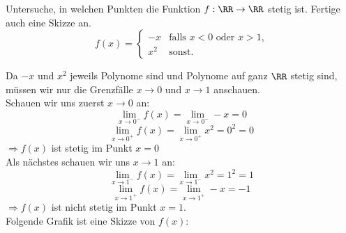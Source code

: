 Untersuche, in welchen Punkten die Funktion $f:\RR\to\RR$ stetig ist. Fertige auch eine Skizze an.
\[
f(x)=
\begin{cases}
    -x & \text{falls $x<0$ oder $x>1$,} \\
    x^2 & \text{sonst.}
\end{cases}
\]

\begin{solution}
    Da $-x$ und $x^2$ jeweils Polynome sind und Polynome auf ganz $\RR$ stetig sind, müssen wir nur die Grenzfälle $x\to0$ und $x\to1$ anschauen. \\
    Schauen wir uns zuerst $x\to0$ an: 
    \[\lim_{x\to0^-}f(x)=\lim_{x\to0^-}-x=0\]
    \[\lim_{x\to0^+}f(x)=\lim_{x\to0^+}x^2=0^2=0\]
    $\Rightarrow f(x)$ ist stetig im Punkt $x=0$ \\
    Als nächstes schauen wir uns $x\to1$ an:
    \[\lim_{x\to1^-}f(x)=\lim_{x\to1^-}x^2=1^2=1\]
    \[\lim_{x\to1^+}f(x)=\lim_{x\to1^+}-x=-1\] 
    $\Rightarrow f(x)$ ist nicht stetig im Punkt $x=1$. \\
    Folgende Grafik ist eine Skizze von $f(x)$:
    \begin{center}
    \end{center}
\end{solution}